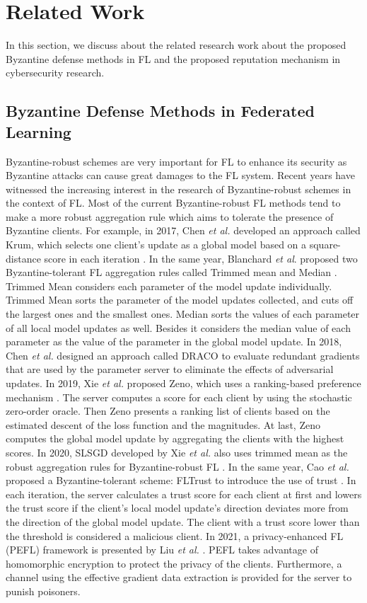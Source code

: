 \documentclass[lettersize,journal]{IEEEtran}
\begin{document}
\section{Related Work}
In this section, we discuss about the related research work about the proposed Byzantine defense methods in FL and the proposed reputation mechanism in cybersecurity research.
\subsection{Byzantine Defense Methods in Federated Learning}
Byzantine-robust schemes are very important for FL to enhance its security as Byzantine attacks can cause great damages to the FL system. Recent years have witnessed the increasing interest in the research of Byzantine-robust schemes in the context of FL. Most of the current Byzantine-robust FL methods tend to make a more robust aggregation rule which aims to tolerate the presence of Byzantine clients. 
For example, in 2017, Chen \textit{et al.} developed an approach called Krum, which selects one client's update as a global model based on a square-distance score in each iteration \cite{ref_12_defense}.
In the same year, Blanchard \textit{et al}. proposed two Byzantine-tolerant FL aggregation rules called Trimmed mean and Median \cite{ref_16_defense}. Trimmed Mean considers each parameter of the model update individually. Trimmed Mean sorts the parameter of the model updates collected, and cuts off the largest ones and the smallest ones. Median sorts the values of each parameter of all local model updates as well. Besides it considers the median value of each parameter as the value of the parameter in the global model update. 
In 2018, Chen \textit{et al.} designed an approach called DRACO to evaluate redundant gradients that are used by the parameter server to eliminate the effects of adversarial updates. 
In 2019, Xie \textit{et al.} proposed Zeno, which uses a ranking-based preference mechanism \cite{ref_15_defense}. The server computes a score for each client by using the stochastic zero-order oracle. Then Zeno presents a ranking list of clients based on the estimated descent of the loss function and the magnitudes. At last, Zeno computes the global model update by aggregating the clients with the highest scores. 
In 2020, SLSGD developed by Xie \textit{et al.} also uses trimmed mean as the robust aggregation rules for Byzantine-robust FL \cite{ref_14_defense}. 
In the same year, Cao \textit{et al.} proposed a Byzantine-tolerant scheme: FLTrust to introduce the use of trust \cite{ref_17_defense}. In each iteration, the server calculates a trust score for each client at first and lowers the trust score if the client's local model update's direction deviates more from the direction of the global model update. The client with a trust score lower than the threshold is considered a malicious client.
In 2021, a privacy-enhanced FL (PEFL) framework is presented by Liu \textit{et al.}  \cite{ref_45_defense}. PEFL takes advantage of homomorphic encryption to protect the privacy of the clients. Furthermore, a channel using the effective gradient data extraction is provided for the server to punish poisoners.
\end{document}
